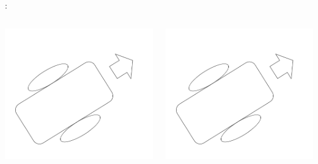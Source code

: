 \documentclass[aspectratio=169,dvipdfmx,cjk]{beamer}
\begin{document}
\begin{frame}{\insertsection \thesubsection: \insertsubsection}
\begin{columns}
\begin{column}{0.33\textwidth}
      \includegraphics[width=1.0\linewidth]{fig/robot.png}
    \end{column}
    \begin{column}{0.33\textwidth}
      \includegraphics[width=1.0\linewidth]{fig/robot.png}
    \end{column}
  \end{columns}
\end{frame}
\end{document}
